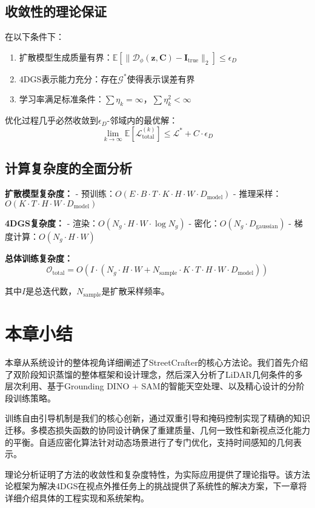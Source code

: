 \subsection{收敛性的理论保证}

\begin{theorem}[多模态损失收敛性]
在以下条件下：
\begin{enumerate}
\item 扩散模型生成质量有界：$\mathbb{E}[\|\mathcal{D}_\phi(\mathbf{z}, \mathbf{C}) - \mathbf{I}_{\text{true}}\|_2] \leq \epsilon_D$
\item 4DGS表示能力充分：存在$\mathcal{G}^*$使得表示误差有界
\item 学习率满足标准条件：$\sum \eta_k = \infty$，$\sum \eta_k^2 < \infty$
\end{enumerate}
优化过程几乎必然收敛到$\epsilon_D$-邻域内的最优解：
\begin{equation}
\lim_{k \to \infty} \mathbb{E}[\mathcal{L}_{\text{total}}^{(k)}] \leq \mathcal{L}^* + C \cdot \epsilon_D
\end{equation}
\end{theorem}

\subsection{计算复杂度的全面分析}

\textbf{扩散模型复杂度：}
- 预训练：$O(E \cdot B \cdot T \cdot K \cdot H \cdot W \cdot D_{\text{model}})$
- 推理采样：$O(K \cdot T \cdot H \cdot W \cdot D_{\text{model}})$

\textbf{4DGS复杂度：}
- 渲染：$O(N_g \cdot H \cdot W \cdot \log N_g)$
- 密化：$O(N_g \cdot D_{\text{gaussian}})$
- 梯度计算：$O(N_g \cdot H \cdot W)$

\textbf{总体训练复杂度：}
\begin{equation}
\mathcal{O}_{\text{total}} = O(I \cdot (N_g \cdot H \cdot W + N_{\text{sample}} \cdot K \cdot T \cdot H \cdot W \cdot D_{\text{model}}))
\label{eq:total_complexity}
\end{equation}

其中$I$是总迭代数，$N_{\text{sample}}$是扩散采样频率。

\section{本章小结}

本章从系统设计的整体视角详细阐述了StreetCrafter的核心方法论。我们首先介绍了双阶段知识蒸馏的整体框架和设计理念，然后深入分析了LiDAR几何条件的多层次利用、基于Grounding DINO + SAM的智能天空处理、以及精心设计的分阶段训练策略。

训练自由引导机制是我们的核心创新，通过双重引导和掩码控制实现了精确的知识迁移。多模态损失函数的协同设计确保了重建质量、几何一致性和新视点泛化能力的平衡。自适应密化算法针对动态场景进行了专门优化，支持时间感知的几何表示。

理论分析证明了方法的收敛性和复杂度特性，为实际应用提供了理论指导。该方法论框架为解决4DGS在视点外推任务上的挑战提供了系统性的解决方案，下一章将详细介绍具体的工程实现和系统架构。